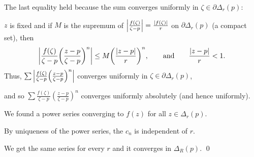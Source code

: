 \documentclass[10pt,aspectratio=169]{beamer}
\begin{document}
\begin{frame}
The last equality held because the sum converges uniformly in 
$\zeta \in \partial \Delta_r(p)$:

\pause
\medskip

$z$ is fixed and if $M$ is the supremum of $\left\lvert {\frac{f(\zeta)}{\zeta-p}} \right\rvert =
\frac{\lvert {f(\zeta)} \rvert}{r}$ on $\partial \Delta_r(p)$ (a compact set),
\pause
then
\begin{equation*}
\left\lvert {
\frac{f(\zeta)}{\zeta-p}
{\left(\frac{z-p}{\zeta-p}\right)}^n
} \right\rvert
\leq
M 
{\left(\frac{\left\lvert {z-p} \right\rvert}{r}\right)}^n,
\qquad \text{and} \qquad
\frac{\left\lvert {z-p} \right\rvert}{r} < 1 .
\end{equation*}
\pause
Thus, $\sum 
\left\lvert {
\frac{f(\zeta)}{\zeta-p}
{\left(\frac{z-p}{\zeta-p}\right)}^n
} \right\rvert$ converges uniformly in $\zeta \in \partial \Delta_r(p)$,
\pause
\medskip

and so
$\sum 
\frac{f(\zeta)}{\zeta-p}
{\left(\frac{z-p}{\zeta-p}\right)}^n$ converges uniformly absolutely
(and hence uniformly).

\medskip
\pause

We found a power series converging to $f(z)$ for all $z \in \Delta_r(p)$.

\pause
\medskip

By uniqueness of the power series, the $c_n$ is independent of $r$.

\medskip
\pause

We get the same series for every $r$ and it converges in $\Delta_R(p)$.
\qed

\end{frame}
\end{document}
